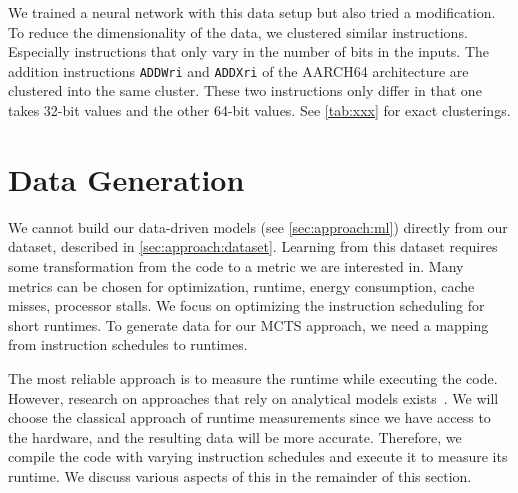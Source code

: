 We trained a neural network with this data setup but also tried a modification.
To reduce the dimensionality of the data, we clustered similar instructions.
Especially instructions that only vary in the number of bits in the inputs.
The addition instructions \lstinline|ADDWri| and \lstinline|ADDXri| of the AARCH64 architecture are clustered into the same cluster.
These two instructions only differ in that one takes 32-bit values and the other 64-bit values.
See \cref{tab:xxx} for exact clusterings.

\section{Data Generation}
\tobechecked
We cannot build our data-driven models (see \cref{sec:approach:ml}) directly from our dataset, described in \cref{sec:approach:dataset}.
Learning from this dataset requires some transformation from the code to a metric we are interested in.
Many metrics can be chosen for optimization, \eg runtime, energy consumption, cache misses, processor stalls.
We focus on optimizing the instruction scheduling for short runtimes.
To generate data for our MCTS approach, we need a mapping from instruction schedules to runtimes.

The most reliable approach is to measure the runtime while executing the code.
However, research on approaches that rely on analytical models exists~\cite{llvm:mca, mendis2019ithemal, taha2003instruction, laukemann2018automated}.
We will choose the classical approach of runtime measurements since we have access to the hardware, and the resulting data will be more accurate.
Therefore, we compile the code with varying instruction schedules and execute it to measure its runtime.
We discuss various aspects of this in the remainder of this section.

